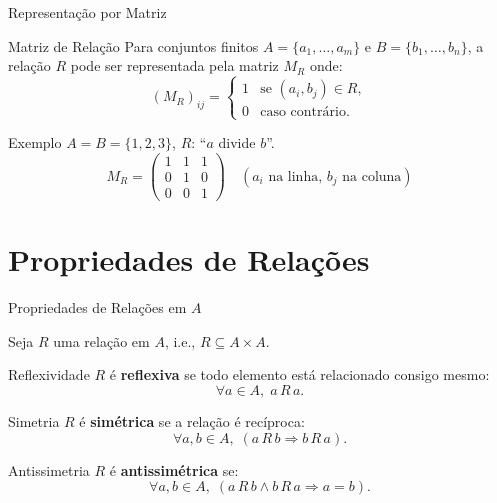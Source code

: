 \documentclass[9pt]{beamer}
\begin{document}
\begin{frame}{Representação por Matriz}

\begin{block}{Matriz de Relação}
Para conjuntos finitos $A = \{a_1,\dots,a_m\}$ e $B = \{b_1,\dots,b_n\}$, a relação $R$ pode ser representada pela matriz $M_R$ onde:
\[
(M_R)_{ij} = 
\begin{cases}
1 & \text{se } (a_i, b_j) \in R, \\
0 & \text{caso contrário.}
\end{cases}
\]
\end{block}

\begin{block}{Exemplo}
$A = B = \{1,2,3\}$, $R$: ``$a$ divide $b$''.
\[
M_R = 
\begin{pmatrix}
1 & 1 & 1 \\
0 & 1 & 0 \\
0 & 0 & 1
\end{pmatrix}
\quad (a_i \text{ na linha, } b_j \text{ na coluna})
\]
\end{block}

\end{frame}

\section{Propriedades de Relações}

\begin{frame}{Propriedades de Relações em $A$}

Seja $R$ uma relação em $A$, i.e., $R \subseteq A \times A$.

\begin{block}{Reflexividade}
$R$ é \textbf{reflexiva} se todo elemento está relacionado consigo mesmo:
\[
\forall a \in A,\; a\,R\,a.
\]
\end{block}

\begin{block}{Simetria}
$R$ é \textbf{simétrica} se a relação é recíproca:
\[
\forall a,b \in A,\; (a\,R\,b \Rightarrow b\,R\,a).
\]
\end{block}

\begin{block}{Antissimetria}
$R$ é \textbf{antissimétrica} se:
\[
\forall a,b \in A,\; (a\,R\,b \land b\,R\,a \Rightarrow a = b).
\]
\end{block}

\end{frame}
\end{document}
